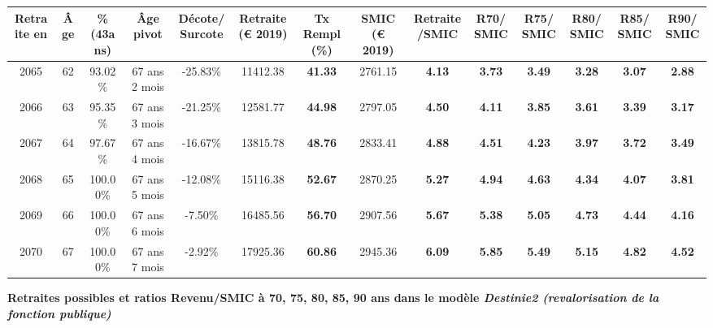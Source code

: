 \begin{adjustbox}{max width=\textwidth} 
\begin{tabular}[htb]{|c|c||c|c|c||c|c||c|c||c|c|c|c|c|} 
\hline 
 Retraite en &  Âge &  \%(43ans) &  Âge pivot &  Décote/Surcote &  Retraite (\euro{} 2019) &  Tx Rempl(\%) &  SMIC (\euro{} 2019) &  Retraite/SMIC &  R70/SMIC &  R75/SMIC &  R80/SMIC &  R85/SMIC &  R90/SMIC \\ 
\hline \hline 
 2065 &  62 &  93.02\% &  67 ans 2 mois &  -25.83\% &  11412.38 &  {\bf 41.33} &  2761.15 &  {\bf 4.13} &  {\bf 3.73} &  {\bf 3.49} &  {\bf 3.28} &  {\bf 3.07} &  {\bf 2.88} \\ 
\hline 
 2066 &  63 &  95.35\% &  67 ans 3 mois &  -21.25\% &  12581.77 &  {\bf 44.98} &  2797.05 &  {\bf 4.50} &  {\bf 4.11} &  {\bf 3.85} &  {\bf 3.61} &  {\bf 3.39} &  {\bf 3.17} \\ 
\hline 
 2067 &  64 &  97.67\% &  67 ans 4 mois &  -16.67\% &  13815.78 &  {\bf 48.76} &  2833.41 &  {\bf 4.88} &  {\bf 4.51} &  {\bf 4.23} &  {\bf 3.97} &  {\bf 3.72} &  {\bf 3.49} \\ 
\hline 
 2068 &  65 &  100.00\% &  67 ans 5 mois &  -12.08\% &  15116.38 &  {\bf 52.67} &  2870.25 &  {\bf 5.27} &  {\bf 4.94} &  {\bf 4.63} &  {\bf 4.34} &  {\bf 4.07} &  {\bf 3.81} \\ 
\hline 
 2069 &  66 &  100.00\% &  67 ans 6 mois &  -7.50\% &  16485.56 &  {\bf 56.70} &  2907.56 &  {\bf 5.67} &  {\bf 5.38} &  {\bf 5.05} &  {\bf 4.73} &  {\bf 4.44} &  {\bf 4.16} \\ 
\hline 
 2070 &  67 &  100.00\% &  67 ans 7 mois &  -2.92\% &  17925.36 &  {\bf 60.86} &  2945.36 &  {\bf 6.09} &  {\bf 5.85} &  {\bf 5.49} &  {\bf 5.15} &  {\bf 4.82} &  {\bf 4.52} \\ 
\hline 
\hline 
\end{tabular} 
\end{adjustbox} 
 
 \vspace{0.1cm} 
{\bf \noindent Retraites possibles et ratios Revenu/SMIC à 70, 75, 80, 85, 90 ans dans le modèle \emph{Destinie2 (revalorisation de la fonction publique)}}  
 
